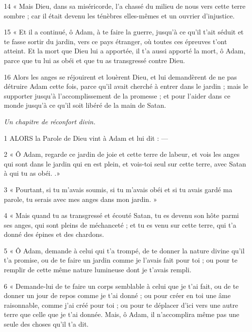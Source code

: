\par 14 « Mais Dieu, dans sa miséricorde, l'a chassé du milieu de nous vers cette terre sombre ; car il était devenu les ténèbres elles-mêmes et un ouvrier d’injustice.

\par 15 « Et il a continué, ô Adam, à te faire la guerre, jusqu'à ce qu'il t'ait séduit et te fasse sortir du jardin, vers ce pays étranger, où toutes ces épreuves t'ont atteint. Et la mort que Dieu lui a apportée, il t'a aussi apporté la mort, ô Adam, parce que tu lui as obéi et que tu as transgressé contre Dieu.

\par 16 Alors les anges se réjouirent et louèrent Dieu, et lui demandèrent de ne pas détruire Adam cette fois, parce qu'il avait cherché à entrer dans le jardin ; mais le supporter jusqu'à l'accomplissement de la promesse ; et pour l'aider dans ce monde jusqu'à ce qu'il soit libéré de la main de Satan.


\par \textit{Un chapitre de réconfort divin.}

\par 1 ALORS la Parole de Dieu vint à Adam et lui dit : —

\par 2 « Ô Adam, regarde ce jardin de joie et cette terre de labeur, et vois les anges qui sont dans le jardin qui en est plein, et vois-toi seul sur cette terre, avec Satan à qui tu as obéi. .»

\par 3 « Pourtant, si tu m'avais soumis, si tu m'avais obéi et si tu avais gardé ma parole, tu serais avec mes anges dans mon jardin. »

\par 4 « Mais quand tu as transgressé et écouté Satan, tu es devenu son hôte parmi ses anges, qui sont pleins de méchanceté ; et tu es venu sur cette terre, qui t'a donné des épines et des chardons.

\par 5 « Ô Adam, demande à celui qui t'a trompé, de te donner la nature divine qu'il t'a promise, ou de te faire un jardin comme je l'avais fait pour toi ; ou pour te remplir de cette même nature lumineuse dont je t'avais rempli.

\par 6 « Demande-lui de te faire un corps semblable à celui que je t'ai fait, ou de te donner un jour de repos comme je t'ai donné ; ou pour créer en toi une âme raisonnable, comme j'ai créé pour toi ; ou pour te déplacer d'ici vers une autre terre que celle que je t'ai donnée. Mais, ô Adam, il n’accomplira même pas une seule des choses qu’il t’a dit.

